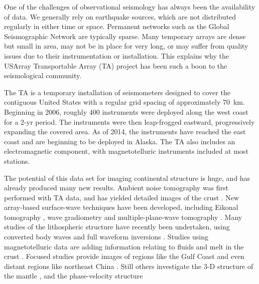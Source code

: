 \documentclass[12pt,oneside]{book}
\begin{document}
One of the challenges of observational seismology has always been the availability of data. We generally rely on earthquake sources, which are not distributed regularly in either time or space. Permanent networks such as the Global Seismographic Network are typically sparse. Many temporary arrays are dense but small in area, may not be in place for very long, or may suffer from quality issues due to their instrumentation or installation. This explains why the USArray Transportable Array (TA) project has been such a boon to the seismological community. 

The TA is a temporary installation of seismometers designed to cover the contiguous United States with a regular grid spacing of approximately 70~km. Beginning in 2006, roughly 400 instruments were deployed along the west coast for a 2-yr period. The instruments were then leap-frogged eastward, progressively expanding the covered area. As of 2014, the instruments have reached the east coast and are beginning to be deployed in Alaska. The TA also includes an electromagnetic component, with magnetotelluric instruments included at most stations.

The potential of this data set for imaging continental structure is huge, and has already produced many new results. Ambient noise tomography was first performed with TA data, and has yielded detailed images of the crust \citep[e.g.,][]{Shapiroetal2005, Linetal2008, Ekstrometal2009, Ekstrom2014}. New array-based surface-wave techniques have been developed, including Eikonal tomography \citep{Lin2009}, wave gradiometry \citep{Liang2009} and multiple-plane-wave tomography \citep{Forsyth2005, Yang2006a, Pollitz2010}. Many studies of the lithospheric structure have recently been undertaken, using converted body waves \citep[e.g.,][]{KFosteretal2014, Hopperetal2014} and full waveform inversions \citep[e.g.,][]{Yuanetal2014}. Studies using magnetotelluric data are adding information relating to fluids and melt in the crust \citep[e.g.,][]{Meqbeletal2014}. Focused studies provide images of regions like the Gulf Coast \citep{Evanziaetal2014} and even distant regions like northeast China \citep{Niu2014}. Still others investigate the 3\nobreakdash-D structure of the mantle \citep[e.g.,][]{Burdicketal2008, Obrebskietal2011, Porrittetal2014}, and the phase-velocity structure \citep[e.g.,][]{YangRitzwoller2008} 
\end{document}
